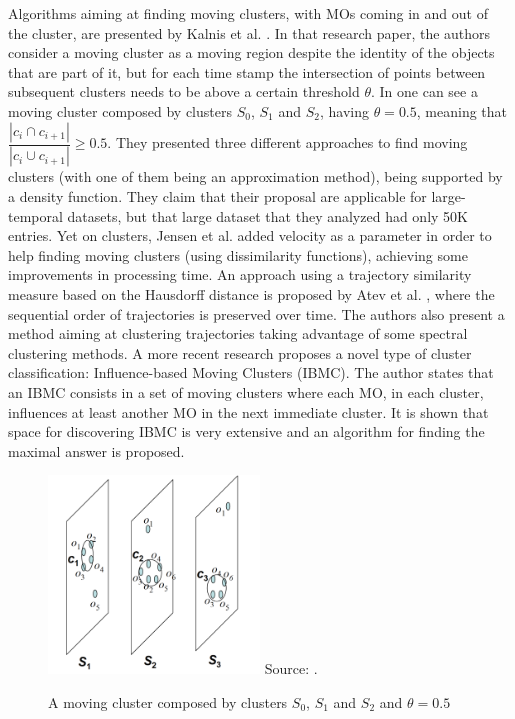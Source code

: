 Algorithms aiming at finding moving clusters, with MOs coming in and out of the cluster, are presented by Kalnis et al.
\citep{movingclusters}. In that research paper, the authors consider a moving cluster as a moving region despite the
identity of the objects that are part of it, but for each time stamp the intersection of points between subsequent
clusters needs to be above a certain threshold $\theta$. In  one can see a moving cluster composed
by clusters $S_0$, $S_1$ and $S_2$, having $\theta=0.5$, meaning that $\dfrac{|c_i \cap c_{i+1}|}{|c_i \cup c_{i+1}|}
\geq 0.5$. They presented three different approaches to find moving clusters (with one of them being an approximation
method), being supported by a density function. They claim that their proposal are applicable for large-temporal
datasets, but that large dataset that they analyzed had only 50K entries. Yet on clusters, Jensen et al.
\citep{clusters3} added velocity as a parameter in order to help finding moving clusters (using dissimilarity
functions), achieving some improvements in processing time. An approach using a trajectory similarity measure based on
the Hausdorff distance is proposed by Atev et al. \citep{clusters2}, where the sequential order of trajectories is
preserved over time. The authors also present a method aiming at clustering trajectories taking advantage of some
spectral clustering methods. A more recent research \citep{clusters1} proposes a novel type of cluster classification:
Influence-based Moving Clusters (IBMC). The author states that an IBMC consists in a set of moving clusters where each
MO, in each cluster, influences at least another MO in the next immediate cluster. It is shown that space for
discovering IBMC is very extensive and an algorithm for finding the maximal answer is proposed.

\begin{figure}
    \centering
    \caption{A moving cluster composed by clusters $S_0$, $S_1$ and $S_2$ and $\theta=0.5$}
    \includegraphics[width=0.5\textwidth]{images/clusters.png}
    \footnotesize{Source: \citep{movingclusters}.}
    \label{fig:clusters}
\end{figure}

